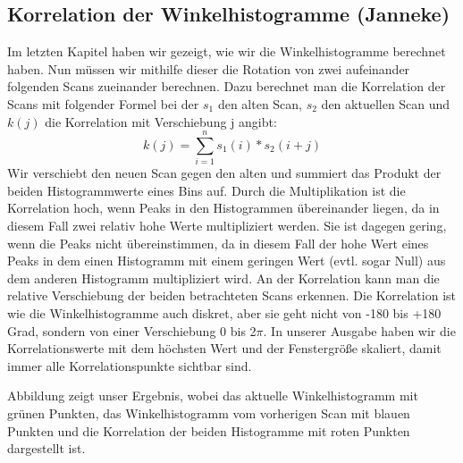 \subsection{Korrelation der Winkelhistogramme (Janneke)}

Im letzten Kapitel haben wir gezeigt, wie wir die Winkelhistogramme berechnet haben. Nun müssen wir mithilfe dieser die Rotation von zwei aufeinander folgenden Scans zueinander berechnen. Dazu berechnet man die Korrelation der Scans mit folgender Formel bei der $s_1$ den alten Scan, $s_2$ den aktuellen Scan und $k(j)$ die Korrelation mit Verschiebung j angibt:$$k(j) = \sum_{i = 1}^{n} s_1(i)*s_2(i+j)$$
Wir verschiebt den neuen Scan gegen den alten und summiert das Produkt der beiden Histogrammwerte eines Bins auf. Durch die Multiplikation ist die Korrelation hoch, wenn Peaks in den Histogrammen übereinander liegen, da in diesem Fall zwei relativ hohe Werte multipliziert werden. Sie ist dagegen gering, wenn die Peaks nicht übereinstimmen, da in diesem Fall der hohe Wert eines Peaks in dem einen Histogramm mit einem geringen Wert (evtl. sogar Null) aus dem anderen Histogramm multipliziert wird. An der Korrelation kann man die relative Verschiebung der beiden betrachteten Scans erkennen. Die Korrelation ist wie die Winkelhistogramme auch diskret, aber sie geht nicht von -180 bis +180 Grad, sondern von einer Verschiebung 0 bis 2$\pi$. In unserer Ausgabe haben wir die Korrelationswerte mit dem höchsten Wert und der Fenstergröße skaliert, damit immer alle Korrelationspunkte sichtbar sind.


Abbildung %
zeigt unser Ergebnis, wobei das aktuelle Winkelhistogramm mit grünen Punkten, das Winkelhistogramm vom vorherigen Scan mit blauen Punkten und die Korrelation der beiden Histogramme mit roten Punkten dargestellt ist.